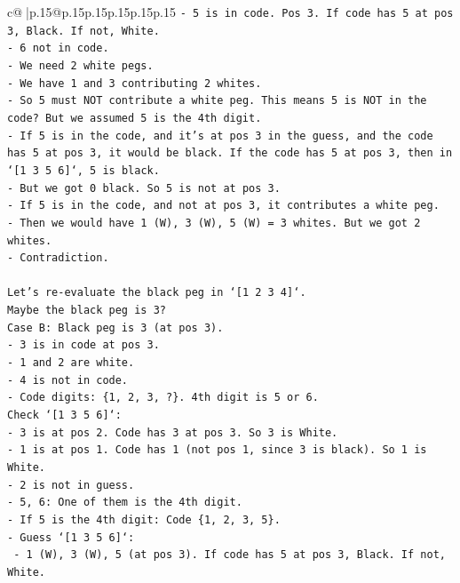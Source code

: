 \documentclass{article}
\begin{document}
{\begin{supertabular}{c@{$\;$}|p{.15\linewidth}@{}p{.15\linewidth}p{.15\linewidth}p{.15\linewidth}p{.15\linewidth}p{.15\linewidth}}
{{{\texttt{{-} 5 is in code. Pos 3. If code has 5 at pos 3, Black. If not, White.} \\
\texttt{{-} 6 not in code.} \\
\texttt{{-} We need 2 white pegs.} \\
\texttt{{-} We have 1 and 3 contributing 2 whites.} \\
\texttt{{-} So 5 must NOT contribute a white peg. This means 5 is NOT in the code? But we assumed 5 is the 4th digit.} \\
\texttt{{-} If 5 is in the code, and it's at pos 3 in the guess, and the code has 5 at pos 3, it would be black. If the code has 5 at pos 3, then in `{[}1 3 5 6{]}`, 5 is black.} \\
\texttt{{-} But we got 0 black. So 5 is not at pos 3.} \\
\texttt{{-} If 5 is in the code, and not at pos 3, it contributes a white peg.} \\
\texttt{{-} Then we would have 1 (W), 3 (W), 5 (W) = 3 whites. But we got 2 whites.} \\
\texttt{{-} Contradiction.} \\
\\ 
\texttt{Let's re{-}evaluate the black peg in `{[}1 2 3 4{]}`.} \\
\texttt{Maybe the black peg is 3?} \\
\texttt{Case B: Black peg is 3 (at pos 3).} \\
\texttt{{-} 3 is in code at pos 3.} \\
\texttt{{-} 1 and 2 are white.} \\
\texttt{{-} 4 is not in code.} \\
\texttt{{-} Code digits: \{1, 2, 3, ?\}. 4th digit is 5 or 6.} \\
\texttt{Check `{[}1 3 5 6{]}`:} \\
\texttt{{-} 3 is at pos 2. Code has 3 at pos 3. So 3 is White.} \\
\texttt{{-} 1 is at pos 1. Code has 1 (not pos 1, since 3 is black). So 1 is White.} \\
\texttt{{-} 2 is not in guess.} \\
\texttt{{-} 5, 6: One of them is the 4th digit.} \\
\texttt{{-} If 5 is the 4th digit: Code \{1, 2, 3, 5\}.} \\
\texttt{{-} Guess `{[}1 3 5 6{]}`:} \\
\texttt{  {-} 1 (W), 3 (W), 5 (at pos 3). If code has 5 at pos 3, Black. If not, White.} \\
}}}
\end{supertabular}}
\end{document}
